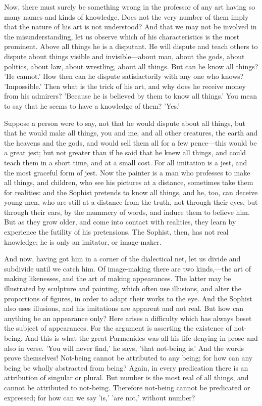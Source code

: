 \documentclass[11pt,letter]{article}
\begin{document}
\par  Now, there must surely be something wrong in the professor of any art having so many names and kinds of knowledge. Does not the very number of them imply that the nature of his art is not understood? And that we may not be involved in the misunderstanding, let us observe which of his characteristics is the most prominent. Above all things he is a disputant. He will dispute and teach others to dispute about things visible and invisible—about man, about the gods, about politics, about law, about wrestling, about all things. But can he know all things? 'He cannot.' How then can he dispute satisfactorily with any one who knows? 'Impossible.' Then what is the trick of his art, and why does he receive money from his admirers? 'Because he is believed by them to know all things.' You mean to say that he seems to have a knowledge of them? 'Yes.'

\par  Suppose a person were to say, not that he would dispute about all things, but that he would make all things, you and me, and all other creatures, the earth and the heavens and the gods, and would sell them all for a few pence—this would be a great jest; but not greater than if he said that he knew all things, and could teach them in a short time, and at a small cost. For all imitation is a jest, and the most graceful form of jest. Now the painter is a man who professes to make all things, and children, who see his pictures at a distance, sometimes take them for realities: and the Sophist pretends to know all things, and he, too, can deceive young men, who are still at a distance from the truth, not through their eyes, but through their ears, by the mummery of words, and induce them to believe him. But as they grow older, and come into contact with realities, they learn by experience the futility of his pretensions. The Sophist, then, has not real knowledge; he is only an imitator, or image-maker.

\par  And now, having got him in a corner of the dialectical net, let us divide and subdivide until we catch him. Of image-making there are two kinds,—the art of making likenesses, and the art of making appearances. The latter may be illustrated by sculpture and painting, which often use illusions, and alter the proportions of figures, in order to adapt their works to the eye. And the Sophist also uses illusions, and his imitations are apparent and not real. But how can anything be an appearance only? Here arises a difficulty which has always beset the subject of appearances. For the argument is asserting the existence of not-being. And this is what the great Parmenides was all his life denying in prose and also in verse. 'You will never find,' he says, 'that not-being is.' And the words prove themselves! Not-being cannot be attributed to any being; for how can any being be wholly abstracted from being? Again, in every predication there is an attribution of singular or plural. But number is the most real of all things, and cannot be attributed to not-being. Therefore not-being cannot be predicated or expressed; for how can we say 'is,' 'are not,' without number?
\end{document}
